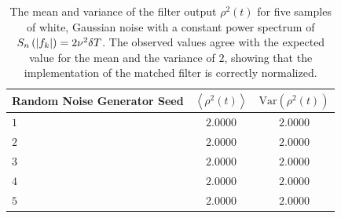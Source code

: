 \begin{table}[p]
  \begin{center}
  \begin{tabular}{l|c|c}
  Random Noise Generator Seed& $\left\langle \rho^2(t) \right\rangle$ & $\mathrm{Var}( \rho^2(t) )$\\
  \hline
  $1$ & $2.0000$ & $2.0000$ \\
  $2$ & $2.0000$ & $2.0000$ \\
  $3$ & $2.0000$ & $2.0000$ \\
  $4$ & $2.0000$ & $2.0000$ \\
  $5$ & $2.0000$ & $2.0000$ \\
  \end{tabular}
  \end{center}
  \caption{%
  The mean and variance of the filter output $\rho^2(t)$ for five samples of
  white, Gaussian noise with a constant power spectrum of $S_n\left(\left|f_{k}\right|\right) =
  2\nu^2\delta T$. The observed values agree with the expected value for the
  mean and the variance of $2$, showing that the implementation of the matched
  filter is correctly normalized. \color{red}{The results are currently fake.}
  }
\label{t:normresults}
\end{table}

\newpage

